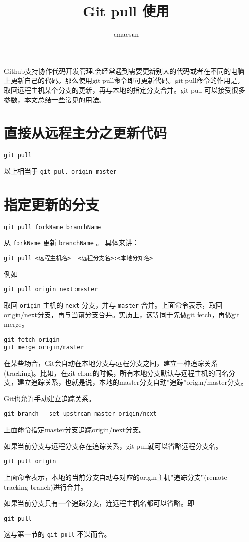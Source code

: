 \documentclass[10pt,a4paper,UTF8]{article}
\author{emacsun}
\date{}
\title{Git pull 使用}
\begin{document}
\maketitle
Github支持协作代码开发管理,会经常遇到需要更新别人的代码或者在不同的电脑上更新自己的代码。那么使用git pull命令即可更新代码。git pull命令的作用是，取回远程主机某个分支的更新，再与本地的指定分支合并。git pull 可以接受很多参数，本文总结一些常见的用法。


\section{直接从远程主分之更新代码}
\label{sec:org566acdb}


\begin{verbatim}
git pull
\end{verbatim}

以上相当于 \texttt{git pull origin master}

\section{指定更新的分支}
\label{sec:org23bc445}


\begin{verbatim}
git pull forkName branchName
\end{verbatim}

从 \texttt{forkName} 更新  \texttt{branchName} 。 具体来讲：
\begin{verbatim}
git pull <远程主机名>  <远程分支名>:<本地分知名>
\end{verbatim}

例如
\begin{verbatim}
git pull origin next:master
\end{verbatim}

取回 \texttt{origin} 主机的 \texttt{next} 分支，并与 \texttt{master} 合并。上面命令表示，取回origin/next分支，再与当前分支合并。实质上，这等同于先做git fetch，再做git merge。
\begin{verbatim}
git fetch origin 
git merge origin/master
\end{verbatim}

在某些场合，Git会自动在本地分支与远程分支之间，建立一种追踪关系(tracking)。比如，在git clone的时候，所有本地分支默认与远程主机的同名分支，建立追踪关系，也就是说，本地的master分支自动”追踪”origin/master分支。

Git也允许手动建立追踪关系。
\begin{verbatim}
git branch --set-upstream master origin/next
\end{verbatim}

上面命令指定master分支追踪origin/next分支。

如果当前分支与远程分支存在追踪关系，git pull就可以省略远程分支名。
\begin{verbatim}
git pull origin
\end{verbatim}

上面命令表示，本地的当前分支自动与对应的origin主机”追踪分支”(remote-tracking branch)进行合并。

如果当前分支只有一个追踪分支，连远程主机名都可以省略。即
\begin{verbatim}
git pull
\end{verbatim}

这与第一节的 \texttt{git pull} 不谋而合。
\end{document}
